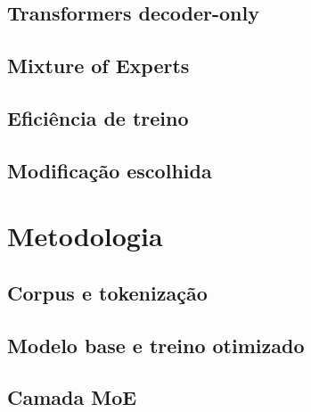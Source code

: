 \documentclass[12pt]{article}
\begin{document}
\subsection{Transformers decoder-only}

\subsection{Mixture of Experts}

\subsection{Eficiência de treino}

\subsection{Modificação escolhida}

\section{Metodologia}\label{sec:metodologia}

\subsection{Corpus e tokenização}

\subsection{Modelo base e treino otimizado}

\subsection{Camada MoE}
\end{document}
